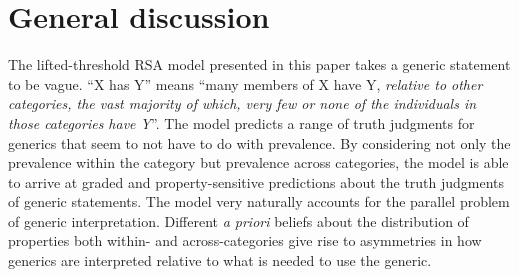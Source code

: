 \documentclass[10pt,letterpaper]{article}
\begin{document}
%
%
%
%


\section{General discussion}

The lifted-threshold RSA model presented in this paper takes a generic statement to be vague. ``X has Y'' means ``many members of X have Y, \emph{relative to other categories, the vast majority of which, very few or none of the individuals in those categories have Y}''. The model predicts a range of truth judgments for generics that seem to not have to do with prevalence. By considering not only the prevalence within the category but prevalence across categories, the model is able to arrive at graded and property-sensitive predictions about the truth judgments of generic statements. The model very naturally accounts for the parallel problem of generic interpretation. Different \emph{a priori} beliefs about the distribution of properties both within- and across-categories give rise to asymmetries in how generics are interpreted relative to what is needed to use the generic. 
\end{document}
